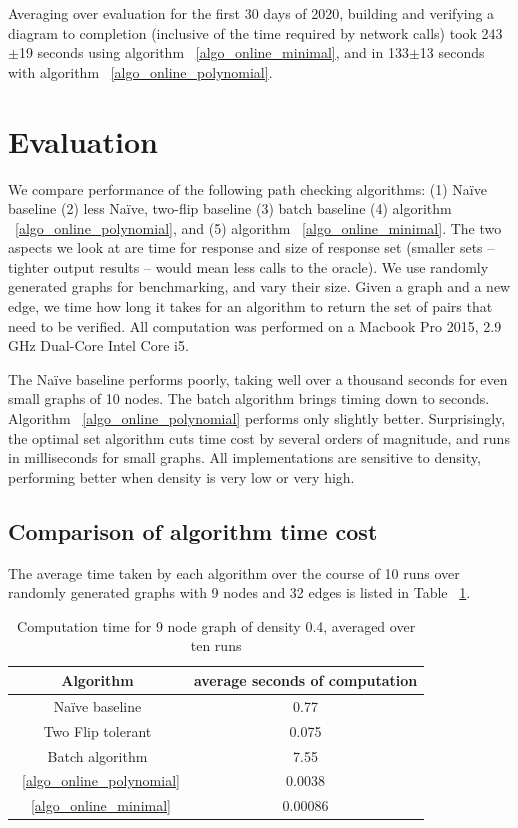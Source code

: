\documentclass[sigplan,review,anonymous]{acmart}
\begin{document}
{Averaging over evaluation for the first 30 days of 2020, building and verifying a diagram to completion (inclusive of the time required by network calls) took 243$\pm$19 seconds using algorithm ~\ref{algo_online_minimal}, and in 133$\pm$13 seconds with algorithm ~\ref{algo_online_polynomial}. 

\section{Evaluation}
\label{sec:evaluation}
We compare performance of the following path checking algorithms: (1) Na\"{i}ve baseline (2) less Na\"{i}ve, two-flip baseline (3) batch baseline (4) algorithm ~\ref{algo_online_polynomial}, and (5) algorithm ~\ref{algo_online_minimal}.
The two aspects we look at are time for response and size of response set (smaller sets -- tighter output results -- would mean less calls to the oracle).
We use randomly generated graphs for benchmarking, and vary their size.
Given a graph and a new edge, we time how long it takes for an algorithm to return  the set of pairs that need to be verified.
All computation was performed on a Macbook Pro 2015, 2.9 GHz Dual-Core Intel Core i5.

The Na\"{i}ve baseline performs poorly, taking well over a thousand seconds for even small graphs of 10 nodes.
The batch algorithm brings timing down to seconds. Algorithm ~\ref{algo_online_polynomial} performs only slightly better.
Surprisingly, the optimal set algorithm cuts time cost by several orders of magnitude, and runs in milliseconds for small graphs.
All implementations are sensitive to density, performing better when density is very low or very high.

\subsection{Comparison of algorithm time cost}
The average time taken by each algorithm over the course of 10 runs over randomly generated graphs with 9 nodes and 32 edges is listed in Table ~\ref{tab:times}.

\begin{table}
\begin{tabular}{|c|c|}
    \hline
    Algorithm & average seconds of computation \\
    \hline
    Na\"{i}ve baseline & 0.77 \\
    Two Flip tolerant & 0.075 \\
    Batch algorithm & 7.55 \\
    ~\ref{algo_online_polynomial} & 0.0038 \\
    ~\ref{algo_online_minimal} & 0.00086 \\
    \hline
\end{tabular}
\caption{Computation time for 9 node graph of density 0.4, averaged over ten runs}
\label{tab:times} %
\end{table}
    
}
\end{document}
